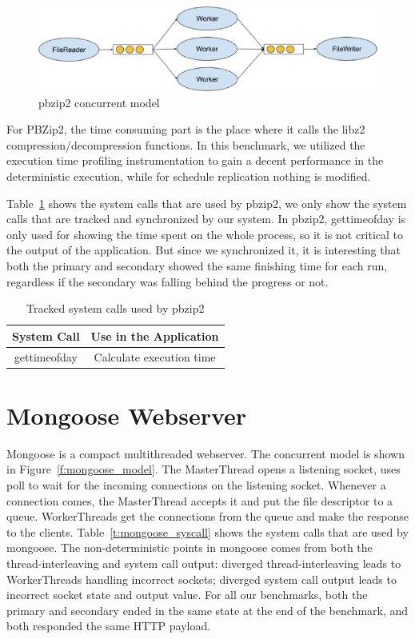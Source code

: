\begin{figure}
\centering
\includegraphics[width=0.8\columnwidth]{figures/pbzip2_model}
\caption{pbzip2 concurrent model}
\label{f:pbzip_model}
\end{figure}

For PBZip2, the time consuming part is the place where it calls the libz2 compression/decompression functions. In this benchmark, we utilized the execution time profiling instrumentation to gain a decent performance in the deterministic execution, while for schedule replication nothing is modified.

Table~\ref{t:pbzip2_syscall} shows the system calls that are used by pbzip2, we only show the system calls that are tracked and synchronized by our system. In pbzip2,  gettimeofday is only used for showing the time spent on the whole process, so it is not critical to the output of the application. But since we synchronized it, it is  interesting that both the primary and secondary showed the same finishing time for each run, regardless if the secondary was falling behind the progress or not.

\begin{table}
 \caption{Tracked system calls used by pbzip2}
\begin{center}
 \begin{tabular}{c | c}
 System Call & Use in the Application\\ \hline
 gettimeofday & Calculate execution time
 \end{tabular}
\end{center}
\label{t:pbzip2_syscall}
\end{table}

\section{Mongoose Webserver}

Mongoose is a compact multithreaded webserver. The concurrent model is shown in Figure~\ref{f:mongoose_model}. The MasterThread opens a listening socket, uses poll to wait for the incoming connections on the listening socket. Whenever a connection comes, the MasterThread accepts it and put the file descriptor to a queue. WorkerThreads get the connections from the queue and make the response to the clients. Table~\ref{t:mongoose_syscall} shows the system calls that are used by mongoose. The non-deterministic points in mongoose comes from both the thread-interleaving and system call output: diverged thread-interleaving leads to WorkerThreads handling incorrect sockets; diverged system call output leads to incorrect socket state and output value. For all our benchmarks, both the primary and secondary ended in the same state at the end of the benchmark, and both responded the same HTTP payload.

